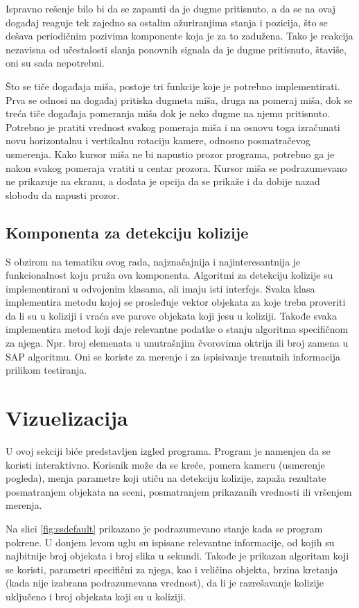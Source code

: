 \documentclass[12pt,oneside]{memoir}
\begin{document}
Ispravno rešenje bilo bi da se zapamti da je dugme pritisnuto,  a da se na ovaj događaj reaguje  tek zajedno sa ostalim ažuriranjima 
stanja i pozicija, što se dešava periodičnim pozivima komponente koja je za to zadužena. Tako je reakcija nezavisna od učestalosti 
slanja ponovnih signala da je dugme pritisnuto, štaviše, oni su sada nepotrebni. 

Što se tiče događaja miša, postoje tri funkcije koje je potrebno implementirati. Prva se odnosi na događaj pritiska 
dugmeta miša, druga na pomeraj miša, dok se treća tiče događaja pomeranja miša dok je neko dugme na njemu pritisnuto.
Potrebno je pratiti vrednost svakog pomeraja miša i na osnovu toga izračunati novu horizontalnu i vertikalnu rotaciju 
kamere, odnosno posmatračevog usmerenja.
Kako kursor miša ne bi napustio prozor programa, 
potrebno ga je nakon svakog pomeraja vratiti u centar prozora.
Kursor miša se podrazumevano ne prikazuje na ekranu, a dodata je opcija da se prikaže i da dobije nazad slobodu da napusti prozor.

\subsection{Komponenta za detekciju kolizije}

S obzirom na tematiku ovog rada, najznačajnija i najinteresantnija je funkcionalnost koju pruža ova komponenta.
Algoritmi za detekciju kolizije su implementirani u odvojenim klasama, ali imaju isti interfejs.
Svaka klasa implementira metodu kojoj se prosleđuje vektor objekata za koje treba proveriti da li su u koliziji
i vraća sve parove objekata koji jesu u koliziji. Takođe svaka implementira metod koji daje relevantne podatke 
o stanju algoritma specifičnom za njega. Npr. broj elemenata u unutrašnjim čvorovima oktrija ili broj 
zamena u SAP algoritmu. Oni se koriste za merenje i za ispisivanje trenutnih informacija prilikom testiranja.

\section{Vizuelizacija}

U ovoj sekciji biće predstavljen izgled programa. 
Program je namenjen da se koristi interaktivno. 
Korisnik može da se kreće, pomera kameru (usmerenje pogleda), menja parametre koji utiču na detekciju kolizije,
zapaža rezultate posmatranjem objekata na sceni, posmatranjem prikazanih vrednosti ili vršenjem merenja.

Na slici \ref{fig:ssdefault} prikazano je podrazumevano stanje kada se program pokrene.
U donjem levom uglu su ispisane relevantne informacije, od kojih su najbitnije broj objekata 
i broj slika u sekundi. Takođe je prikazan algoritam koji se koristi, parametri specifični za njega, kao 
i veličina objekta, brzina kretanja (kada nije izabrana podrazumevana vrednost), da li je razrešavanje kolizije uključeno i
broj objekata koji su u koliziji.
\end{document}
